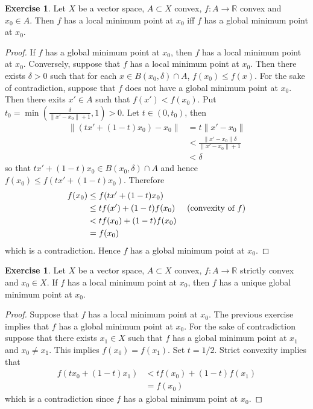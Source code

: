 \documentclass[12pt]{amsart}
\theoremstyle{definition}
\newtheorem{ex}[definition]{Exercise}
\newcommand{\del}{\delta}
\newcommand{\R}{\mathbb{R}}
\DeclareMathOperator*{\0}{\mbf{0}}
\DeclareMathOperator*{\1}{\mbf{1}}
\newcommand{\lex}[1]{\label{ex:#1}}
\begin{document}
	\begin{ex} \lex{91009}
	Let $X$ be a vector space, $A \subset X$ convex, $f:A \rightarrow \R$ convex and $x_0 \in A$. Then $f$ has a local minimum point at $x_0$ iff $f$ has a global minimum point at $x_0$.
	\end{ex}	
	
	\begin{proof}
	If $f$ has a global minimum point at $x_0$, then $f$ has a local minimum point at $x_0$. Conversely, suppose that $f$ has a local minimum point at $x_0$. Then there exists $\del >0$ such that for each $x \in B(x_0, \del) \cap A$, $f(x_0) \leq f(x)$. For the sake of contradiction, suppose that $f$ does not have a global minimum point at $x_0$. Then there exits $x' \in A$ such that $f(x') < f(x_0)$. Put $t_0 = \min(\frac{\del}{\|x' - x_0\| + 1}, 1) >0$. Let $t \in (0, t_0)$, then
	\begin{align*}
	\|(tx' + (1-t)x_0) - x_0\| 
	&= t\|x' -x_0 \| \\
	& <   \frac{\|x' -x_0 \|\del}{\|x' -x_0\| + 1} \\
	& < \del
	\end{align*} 
	so that $tx' + (1-t)x_0 \in B(x_0, \del) \cap A$ and hence $f(x_0) \leq f(tx' + (1-t)x_0)$.  Therefore  
	\begin{align*}
	f(x_0) 
	& \leq f(tx' + (1-t)x_0) \\
	& \leq tf(x') + (1-t)f(x_0)  \hspace{.5cm} (\text{convexity of }f)\\
	& < tf(x_0) + (1-t)f(x_0) \\
	&= f(x_0)
	\end{align*}
	which is a contradiction. Hence $f$ has a global minimum point at $x_0$.
	\end{proof}
	
	\begin{ex} \lex{91010}
	Let $X$ be a vector space, $A \subset X$ convex, $f:A \rightarrow \R$ strictly convex and $x_0 \in X$. If $f$ has a local minimum point at $x_0$, then $f$ has a unique global minimum point at $x_0$.  
	\end{ex}
	
	\begin{proof}
	Suppose that $f$ has a local minimum point at $x_0$. The previous exercise implies that $f$ has a global minimum point at $x_0$. For the sake of contradiction suppose that there exists $x_1 \in X$ such that $f$ has a global minimum point at $x_1$ and $x_0 \neq x_1$. This implies $f(x_0) = f(x_1)$. Set $t = 1/2$. Strict convexity implies that 
	\begin{align*}
	f(tx_0 + (1-t)x_1) 
	&< tf(x_0) + (1-t)f(x_1)  \\
	&= f(x_0) 
	\end{align*}
	which is a contradiction since $f$ has a global minimum point at $x_0$.
	\end{proof}
\end{document}
